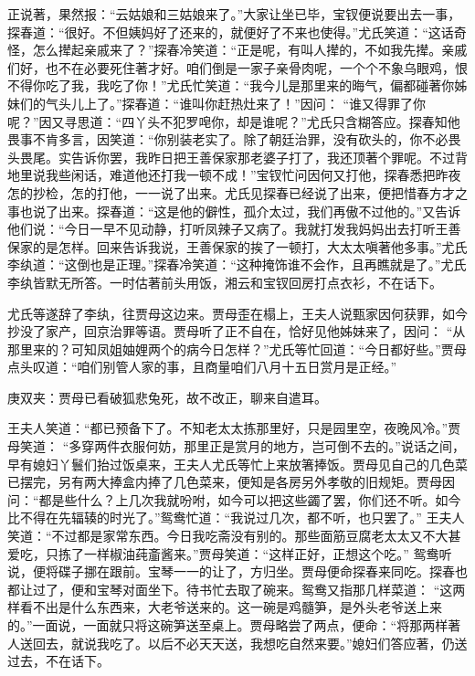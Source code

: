 \begin{parag}
    正说著，果然报：“云姑娘和三姑娘来了。”大家让坐已毕，宝钗便说要出去一事，探春道：“很好。不但姨妈好了还来的，就便好了不来也使得。”尤氏笑道：“这话奇怪，怎么撵起亲戚来了？”探春冷笑道：“正是呢，有叫人撵的，不如我先撵。亲戚们好，也不在必要死住著才好。咱们倒是一家子亲骨肉呢，一个个不象乌眼鸡，恨不得你吃了我，我吃了你！”尤氏忙笑道：“我今儿是那里来的晦气，偏都碰著你姊妹们的气头儿上了。”探春道：“谁叫你赶热灶来了！”因问： “谁又得罪了你呢？”因又寻思道：“四丫头不犯罗唣你，却是谁呢？”尤氏只含糊答应。探春知他畏事不肯多言，因笑道：“你别装老实了。除了朝廷治罪，没有砍头的，你不必畏头畏尾。实告诉你罢，我昨日把王善保家那老婆子打了，我还顶著个罪呢。不过背地里说我些闲话，难道他还打我一顿不成！”宝钗忙问因何又打他，探春悉把昨夜怎的抄检，怎的打他，一一说了出来。尤氏见探春已经说了出来，便把惜春方才之事也说了出来。探春道：“这是他的僻性，孤介太过，我们再傲不过他的。”又告诉他们说：“今日一早不见动静，打听凤辣子又病了。我就打发我妈妈出去打听王善保家的是怎样。回来告诉我说，王善保家的挨了一顿打，大太太嗔著他多事。”尤氏李纨道：“这倒也是正理。”探春冷笑道：“这种掩饰谁不会作，且再瞧就是了。”尤氏李纨皆默无所答。一时估著前头用饭，湘云和宝钗回房打点衣衫，不在话下。
\end{parag}


\begin{parag}
    尤氏等遂辞了李纨，往贾母这边来。贾母歪在榻上，王夫人说甄家因何获罪，如今抄没了家产，回京治罪等语。贾母听了正不自在，恰好见他姊妹来了，因问： “从那里来的？可知凤姐妯娌两个的病今日怎样？”尤氏等忙回道：“今日都好些。”贾母点头叹道：“咱们别管人家的事，且商量咱们八月十五日赏月是正经。”\begin{note}庚双夹：贾母已看破狐悲兔死，故不改正，聊来自遣耳。\end{note}王夫人笑道：“都已预备下了。不知老太太拣那里好，只是园里空，夜晚风冷。”贾母笑道： “多穿两件衣服何妨，那里正是赏月的地方，岂可倒不去的。”说话之间，早有媳妇丫鬟们抬过饭桌来，王夫人尤氏等忙上来放箸捧饭。贾母见自己的几色菜已摆完，另有两大捧盒内捧了几色菜来，便知是各房另外孝敬的旧规矩。贾母因问：“都是些什么？上几次我就吩咐，如今可以把这些蠲了罢，你们还不听。如今比不得在先辐辏的时光了。”鸳鸯忙道：“我说过几次，都不听，也只罢了。” 王夫人笑道：“不过都是家常东西。今日我吃斋没有别的。那些面筋豆腐老太太又不大甚爱吃，只拣了一样椒油莼齑酱来。”贾母笑道：“这样正好，正想这个吃。” 鸳鸯听说，便将碟子挪在跟前。宝琴一一的让了，方归坐。贾母便命探春来同吃。探春也都让过了，便和宝琴对面坐下。待书忙去取了碗来。鸳鸯又指那几样菜道： “这两样看不出是什么东西来，大老爷送来的。这一碗是鸡髓笋，是外头老爷送上来的。”一面说，一面就只将这碗笋送至桌上。贾母略尝了两点，便命：“将那两样著人送回去，就说我吃了。以后不必天天送，我想吃自然来要。”媳妇们答应著，仍送过去，不在话下。
\end{parag}


